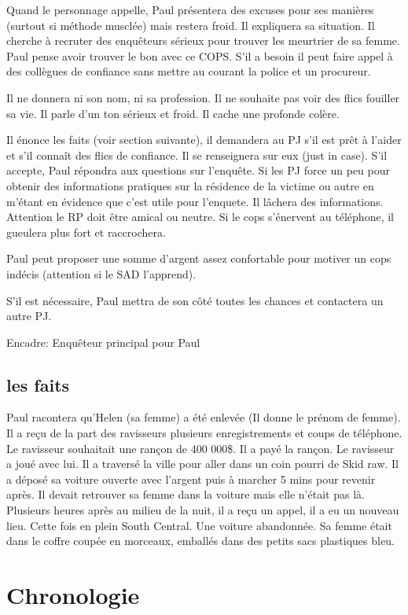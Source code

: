 \documentclass[10pt,a5paper,oneside]{book}
\begin{document}
Quand le personnage appelle, Paul présentera des excuses pour ses manières (surtout si méthode musclée) mais restera froid. Il expliquera sa situation. 
Il cherche à recruter des enquêteurs sérieux pour trouver les meurtrier de sa femme. Paul pense avoir trouver le bon avec ce COPS. S'il a besoin il peut faire appel à des collègues de 
confiance sans mettre au courant la police et un procureur. 

Il ne donnera ni son nom, ni sa profession. Il ne souhaite pas voir des flics fouiller sa vie. Il parle d'un ton sérieux et froid. Il cache une profonde colère. 

Il énonce les faits (voir section suivante), il demandera au PJ s'il est prêt à l'aider et s'il connaît des flics de confiance. Il se renseignera sur eux (just in case).
S'il accepte, Paul répondra aux questions sur l’enquête.
Si les PJ force un peu pour obtenir des informations pratiques sur la résidence de la victime ou autre en m’étant en évidence que c'est utile pour l’enquete. Il lâchera des informations. 
Attention le RP doit être amical ou neutre.
Si le cops s’énervent au téléphone, il gueulera plus fort et raccrochera.

Paul peut proposer une somme d'argent assez confortable pour motiver un cops indécis (attention si le SAD l’apprend). 

S'il est nécessaire, Paul mettra de son côté toutes les chances et contactera un autre PJ.

Encadre: Enquêteur principal pour Paul
 

\subsection{les faits}

Paul racontera qu’Helen (sa femme) a été enlevée (Il donne le prénom de femme). Il a reçu de la part des ravisseurs plusieurs enregistrements et coups de téléphone. Le ravisseur 
souhaitait une rançon de 400 000\$.
Il a payé la rançon. Le ravisseur a joué avec lui. Il a traversé la ville pour aller dans un coin pourri de Skid raw. Il a déposé sa voiture ouverte avec l’argent puis à marcher 5 mins 
pour revenir après. Il devait retrouver sa femme dans la voiture mais elle n'était pas là. Plusieurs heures après au milieu de la nuit, il a reçu un appel, il a eu un nouveau lieu. 
Cette fois en plein South Central. Une voiture abandonnée. Sa femme était dans le coffre coupée en morceaux, emballés dans des petits sacs plastiques bleu.


\section{Chronologie}
\end{document}
